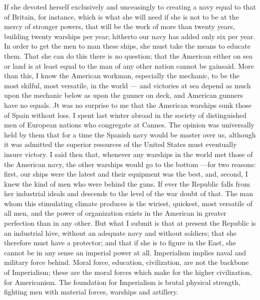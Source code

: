 \documentclass[11pt,openany]{book}
\begin{document}
If she devoted herself exclusively and unceasingly to creating a navy equal to that of Britain, for instance, which is what she will need if she is not to be at the mercy of stronger powers, that will be the work of more than twenty years, building twenty warships per year; hitherto our navy has added only six per year. In order to get the men to man these ships, she must take the means to educate them. That she can do this there is no question; that the American either on sea or land is at least equal to the man of any other nation cannot be gainsaid. More than this, I know the American workman, especially the mechanic, to be the most skilful, most versatile, in the world --- and victories at sea depend as much upon the mechanic below as upon the gunner on deck, and American gunners have no equals. Jt was no surprise to me that the American warships sunk those of Spain without loss. I spent last winter abroad in the society of distinguished men of European nations who congregate at Cannes. The opinion was universally held by them that for a time the Spanish navy would be master over us, although it was admitted the superior resources of the United States must eventually insure victory. I said then that, whenever any warships in the world met those of the American navy, the other warships would go to the bottom ---for two reasons: first, our ships were the latest and their equipment was the best, and, second, I knew the kind of men who were behind the guns. If ever the Republic falls from her industrial ideals and descends to the level of the war doubt of that. The man whom this stimulating climate produces is the wiriest, quickest, most versatile of all men, and the power of organization exists in the American in greater perfection than in any other. But what I submit is that at present the Republic is an industrial hive, without an adequate navy and without soldiers; that she therefore must have a protector; and that if she is to figure in the East, she cannot be in any sense an imperial power at all. Imperialism implies naval and military force behind. Moral force, education, civilization, are not the backbone of Imperialism; these are the moral forces which make for the higher civilization, for Americanism. The foundation for Imperialism is brutal physical strength, fighting men with material forces, warships and artillery.
\end{document}
